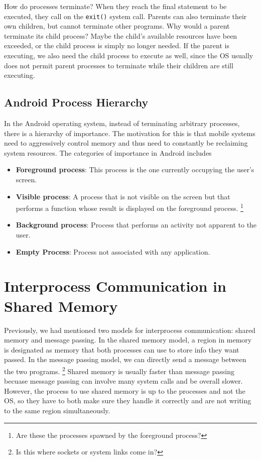 \documentclass{tufte-handout}
\begin{document}
How do processes terminate? When they reach the final statement to be executed, they
call on the \texttt{exit()} system call. Parents can also terminate their own
children, but cannot terminate other programs. Why would a parent terminate its 
child process? Maybe the child's available resources have been exceeded, or the child
process is simply no longer needed. If the parent is executing, we also need 
the child process to execute as well, since the OS usually does not permit parent
processes to terminate while their children are still executing.

\subsection{Android Process Hierarchy}
In the Android operating system, instead of terminating arbitrary processes, there
is a hierarchy of importance. The motivation for this is that mobile systems need to 
aggressively control memory and thus need to constantly be reclaiming system resources. 
The categories of importance in Android includes 
\begin{itemize}
	\item \textbf{Foreground process}: This process is the one currently occupying the user's 
			screen.
	\item \textbf{Visible process}: A process that is not visible on the screen but that 
			performs a function whose result is displayed on the foreground process.
			\footnote{Are these the processes spawned by the foreground process?}
	\item \textbf{Background process}: Process that performs an activity not apparent 
			to the user.
	\item \textbf{Empty Process}: Process not associated with any application.
\end{itemize}

\section{Interprocess Communication in Shared Memory}
Previously, we had mentioned two models for interprocess communication: shared memory and
message passing. In the shared memory model, a region in memory is designated as memory that 
both processes can use to store info they want passed. In the message passing model, we can 
directly send a message between the two programs.
\footnote{Is this where sockets or system links come in?}
Shared memory is usually faster than message passing becuase message passing can involve many
system calls and be overall slower. However, the process to use shared memory is up to the 
processes and not the OS, so they have to both make sure they handle it correctly and are not 
writing to the same region simultaneously.
\end{document}
